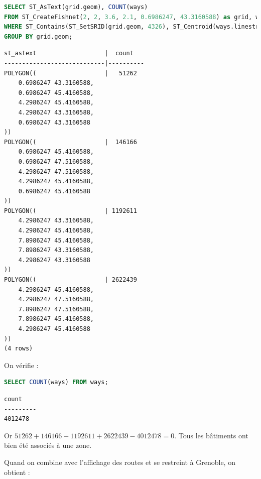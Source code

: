 \documentclass[12pt,a4paper]{article}
\begin{document}
\begin{lstlisting}[language=SQL]
SELECT ST_AsText(grid.geom), COUNT(ways)
FROM ST_CreateFishnet(2, 2, 3.6, 2.1, 0.6986247, 43.3160588) as grid, ways
WHERE ST_Contains(ST_SetSRID(grid.geom, 4326), ST_Centroid(ways.linestring))
GROUP BY grid.geom;
\end{lstlisting}

\begin{lstlisting}
st_astext                   |  count  
----------------------------|----------
POLYGON((                   |   51262
    0.6986247 43.3160588,
    0.6986247 45.4160588,
    4.2986247 45.4160588,
    4.2986247 43.3160588,
    0.6986247 43.3160588
))
POLYGON((                   |  146166
    0.6986247 45.4160588,
    0.6986247 47.5160588,
    4.2986247 47.5160588,
    4.2986247 45.4160588,
    0.6986247 45.4160588
))
POLYGON((                   | 1192611
    4.2986247 43.3160588,
    4.2986247 45.4160588,
    7.8986247 45.4160588,
    7.8986247 43.3160588,
    4.2986247 43.3160588
))
POLYGON((                   | 2622439
    4.2986247 45.4160588,
    4.2986247 47.5160588,
    7.8986247 47.5160588,
    7.8986247 45.4160588,
    4.2986247 45.4160588
))
(4 rows)
\end{lstlisting}

On vérifie :

\begin{lstlisting}[language=SQL]
SELECT COUNT(ways) FROM ways;
\end{lstlisting}

\begin{lstlisting}
count  
---------
4012478
\end{lstlisting}

Or $51262 + 146166 + 1192611 + 2622439 - 4012478 = 0$. Tous les bâtiments ont
bien été associés à une zone.

Quand on combine avec l'affichage des routes et se restreint à Grenoble, on
obtient :
\end{document}
